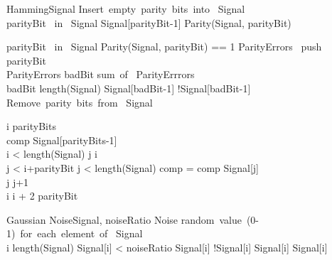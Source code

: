 \documentclass{sigcomm-alternate}
\begin{document}
\begin{pseudocode}{Hamming}{Signal}
		\mbox{Insert empty parity bits into } Signal\\
		\FOREACH parityBit \mbox{ in } Signal \DO
				Signal[parityBit-1] \GETS Parity(Signal, parityBit)\\
	\ENDPROCEDURE

		\FOREACH parityBit \mbox{ in } Signal \DO
			\BEGIN
				\IF Parity(Signal, parityBit) == 1
				\THEN
					ParityErrors \mbox{ push } parityBit
			\END\\
		\IF ParityErrors
		\THEN
			\BEGIN
				badBit \GETS \mbox{sum of } ParityErrrors\\
				\IF badBit \geq length(Signal)
				\THEN
				\ELSE
					Signal[badBit-1] \GETS !Signal[badBit-1]
			\END\\
		\mbox{Remove parity bits from } Signal\\
	\ENDPROCEDURE

		i \GETS parityBits\\
		comp \GETS Signal[parityBits-1]\\
		\WHILE i < length(Signal) \DO
			\BEGIN
				j \GETS i\\
				\WHILE j < i+parityBit \AND j < length(Signal) \DO
					\BEGIN
						comp = comp \oplus Signal[j]\\
						j \GETS j+1
					\END\\
				i \GETS i + 2 \cdot parityBit
			\END\\
	\ENDPROCEDURE
\end{pseudocode}

\begin{pseudocode}{Gaussian Noise}{Signal, noiseRatio}
	Noise \GETS \mbox{random value (0-1) for each element of } Signal\\
	\FOR i  \TO length(Signal) \DO
		\BEGIN
			\IF Signal[i] < noiseRatio
			\THEN
				Signal[i] \GETS !Signal[i]
			\ELSE
				Signal[i] \GETS Signal[i]
		\END\\
\end{pseudocode}
\end{document}
